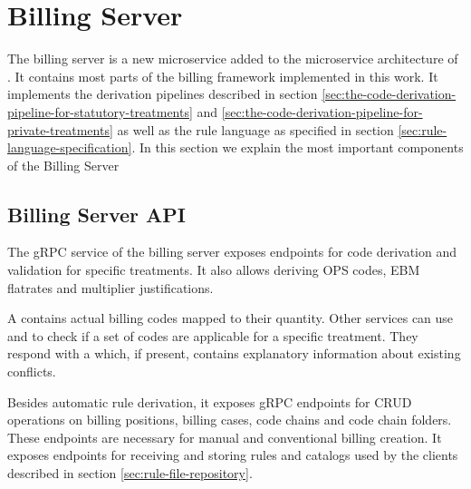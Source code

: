 \section{Billing Server}\label{sec:billing-server}
The billing server is a new microservice added to the microservice architecture of \AV.
It contains most parts of the billing framework implemented in this work.
It implements the derivation pipelines described in section \ref{sec:the-code-derivation-pipeline-for-statutory-treatments}
and \ref{sec:the-code-derivation-pipeline-for-private-treatments}
as well as the rule language as specified in section \ref{sec:rule-language-specification}.
In this section we explain the most important components of the Billing Server

\subsection{Billing Server API}\label{sec:billing-server-api}

The  gRPC service of the billing server exposes endpoints for code derivation and validation for specific treatments.
It also allows deriving OPS codes, EBM flatrates and multiplier justifications.



A  contains actual billing codes mapped to their quantity.
Other services can use  and  to check if a set of codes are applicable for a specific treatment.
They respond with a  which, if present, contains explanatory information about existing conflicts.

Besides automatic rule derivation, it exposes gRPC endpoints for CRUD operations on billing positions, billing cases, code chains and code chain folders.
These endpoints are necessary for manual and conventional billing creation.
It exposes endpoints for receiving and storing rules and catalogs used by the clients described in section \ref{sec:rule-file-repository}.


